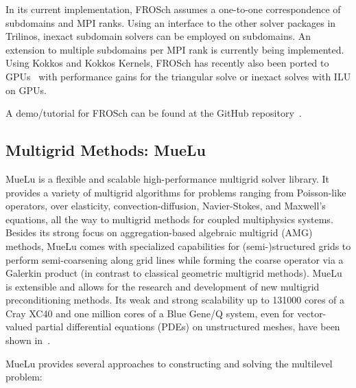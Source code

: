 In its current implementation, FROSch assumes a one-to-one correspondence of subdomains and MPI ranks. Using an interface to the other solver packages in Trilinos, inexact subdomain solvers can be employed on subdomains. An extension to multiple subdomains per MPI rank is currently being implemented. Using Kokkos and Kokkos Kernels, FROSch has recently also been ported to GPUs~\cite{yamazaki_experimental_2023} with performance gains for the triangular solve or inexact solves with ILU on GPUs.

A demo/tutorial for FROSch can be found at the GitHub repository~\cite{frosch_demo}.

\subsection{Multigrid Methods: MueLu}

MueLu is a flexible and scalable high-performance multigrid solver library.
It provides a variety of multigrid algorithms for problems ranging from Poisson-like operators, over elasticity, convection-diffusion, Navier-Stokes, and Maxwell's equations,
all the way to multigrid methods for coupled multiphysics systems.
Besides its strong focus on aggregation-based algebraic multigrid (AMG) methods,
MueLu comes with specialized capabilities for (semi-)structured grids to perform semi-coarsening along grid lines
while forming the coarse operator via a Galerkin product (in contrast to classical geometric multigrid methods).
MueLu is extensible and allows for the research and development of new multigrid preconditioning methods.
Its weak and strong scalability up to \num{131000} cores of a Cray XC40 and one million cores of a Blue Gene/Q system, even for vector-valued partial differential equations (PDEs) on unstructured meshes, have been shown in~\cite{Lin2017a,Thomas2019a}.

MueLu provides several approaches to constructing and solving the multilevel problem:

